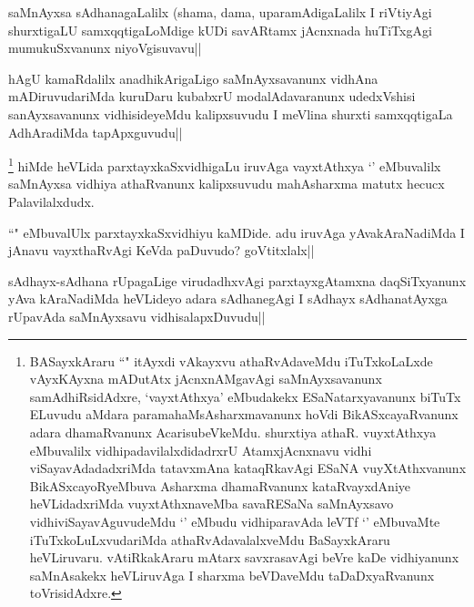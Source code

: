 \begin{artha}
saMnAyxsa sAdhanagaLalilx (shama, dama, uparamAdigaLalilx I riVtiyAgi shurxtigaLU samxqqtigaLoMdige kUDi savARtamx jAcnxnada huTiTxgAgi mumukuSxvanunx niyoVgisuvavu||
\end{artha}


\begin{artha}
hAgU kamaRdalilx anadhikArigaLigo saMnAyxsavanunx vidhAna mADiruvudariMda kuruDaru kubabxrU modalAdavaranunx udedxVshisi sanAyxsavanunx vidhisideyeMdu kalipxsuvudu I meVlina shurxti samxqqtigaLa AdhAradiMda tapApxguvudu||
\end{artha}

\begin{artha}
\footnote[1]{BASayxkAraru ``\stext" itAyxdi vAkayxvu athaRvAdaveMdu iTuTxkoLaLxde vAyxKAyxna mADutAtx jAcnxnAMgavAgi saMnAyxsavanunx samAdhiRsidAdxre, `vayxtAthxya' eMbudakekx ESaNatarxyavanunx biTuTx ELuvudu aMdara paramahaMsAsharxmavanunx hoVdi BikASxcayaRvanunx adara dhamaRvanunx AcarisubeVkeMdu. shurxtiya athaR. vuyxtAthxya eMbuvalilx vidhipadavilalxdidadrxrU AtamxjAcnxnavu vidhi viSayavAdadadxriMda tatavxmAna kataqRkavAgi ESaNA vuyXtAthxvanunx BikASxcayoRyeMbuva Asharxma dhamaRvanunx kataRvayxdAniye heVLidadxriMda vuyxtAthxnaveMba savaRESaNa saMnAyxsavo vidhiviSayavAguvudeMdu `\stext' eMbudu vidhiparavAda leVTf `\stext ' eMbuvaMte iTuTxkoLuLxvudariMda athaRvAdavalalxveMdu BaSayxkAraru heVLiruvaru. vAtiRkakAraru mAtarx savxrasavAgi beVre kaDe vidhiyanunx saMnAsakekx heVLiruvAga I sharxma beVDaveMdu taDaDxyaRvanunx toVrisidAdxre.} hiMde heVLida parxtayxkaSxvidhigaLu iruvAga vayxtAthxya  `\stext ' eMbuvalilx saMnAyxsa vidhiya athaRvanunx kalipxsuvudu mahAsharxma matutx hecucx Palavilalxdudx.
\end{artha}

\begin{artha}
``\stext " eMbuvalUlx parxtayxkaSxvidhiyu kaMDide. adu iruvAga yAvakAraNadiMda I jAnavu vayxthaRvAgi KeVda paDuvudo? goVtitxlalx||
\end{artha}

\begin{artha}%
sAdhayx-sAdhana rUpagaLige virudadhxvAgi parxtayxgAtamxna daqSiTxyanunx yAva kAraNadiMda heVLideyo adara sAdhanegAgi I sAdhayx sAdhanatAyxga rUpavAda saMnAyxsavu vidhisalapxDuvudu||
\end{artha}

